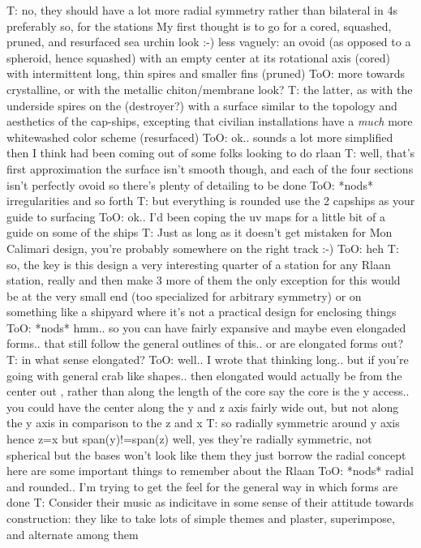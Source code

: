T: no, they should have a lot more radial symmetry rather than bilateral
in 4s preferably
so, for the stations
My first thought is to go for a cored, squashed, pruned, and resurfaced sea urchin look :-)
less vaguely:
an ovoid (as opposed to a spheroid, hence squashed)
with an empty center at its rotational axis (cored)
with intermittent long, thin spires and smaller fins (pruned)
ToO: more towards crystalline, or with the metallic chiton/membrane look?
T: the latter, as with the underside spires on the (destroyer?) with a surface similar to the topology and aesthetics of the cap-ships, excepting that civilian installations have a {\em much} more whitewashed color scheme
(resurfaced)
ToO: ok.. sounds a lot more simplified then I think had been coming out of some folks looking to do rlaan
T: well, that's first approximation
the surface isn't smooth though, and each of the four sections isn't perfectly ovoid
so there's plenty of detailing to be done
ToO: *nods* irregularities and so forth
T: but everything is rounded
use the 2 capships as your guide to surfacing
ToO: ok.. I'd been coping the uv maps for a little bit of a guide on some of the ships
T: Just as long as it doesn't get mistaken for Mon Calimari design, you're probably somewhere on the right track :-)
ToO: heh
T: so, the key is this
design a very interesting quarter of a station
for any Rlaan station, really
and then make 3 more of them
the only exception for this would be at the very small end (too specialized for arbitrary symmetry)
or on something like a shipyard
where it's not a practical design for enclosing things
ToO: *nods* hmm.. so you can have fairly expansive and maybe even elongaded forms.. that still follow the general outlines of this.. or are elongated forms out?
T: in what sense elongated?
ToO: well.. I wrote that thinking long.. but if you're going with general crab like shapes.. then elongated would actually be from the center out , rather than along the length of the core
say the core is the y access.. you could have the center along the y and z axis fairly wide out, but not along the y axis in comparison to the z and x
T: so radially symmetric around y axis hence z=x but span(y)!=span(z)
well, yes
they're radially symmetric, not spherical
but the bases won't look like them
they just borrow the radial concept
here are some important things to remember about the Rlaan
ToO: *nods* radial and rounded.. I'm trying to get the feel for the general way in which forms are done
T: Consider their music as indicitave in some sense of their attitude towards construction: they like to take lots of simple themes and plaster, superimpose, and alternate among them
